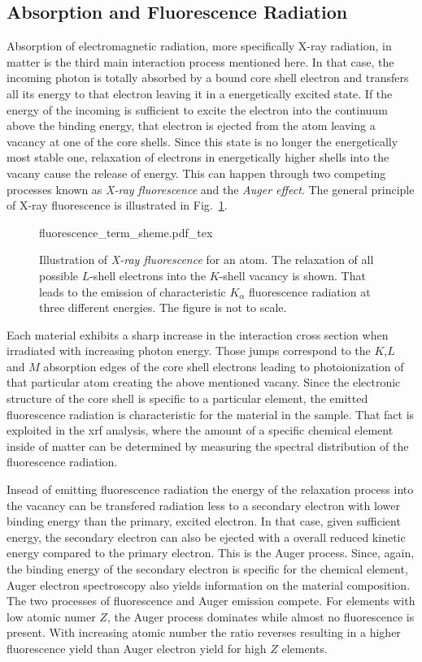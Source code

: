 \subsection{Absorption and Fluorescence Radiation}
Absorption of electromagnetic radiation, more specifically X-ray radiation, in matter is the third main interaction process mentioned here. In that case, the incoming photon is totally absorbed by a bound core shell electron and transfers all its energy to that electron leaving it in a energetically excited state. If the energy of the incoming is sufficient to excite the electron into the continuum above the binding energy, that electron is ejected from the atom leaving a vacancy at one of the core shells. Since this state is no longer the energetically most stable one, relaxation of electrons in energetically higher shells into the vacany cause the release of energy. This can happen through two competing processes known as \emph{X-ray fluorescence} and the \emph{Auger effect}. The general principle of X-ray fluorescence is illustrated in Fig.~\ref{ch_theo:fig_fluorescence_term_sheme}.
\begin{figure}[htb]
    \def\svgwidth{0.5\textwidth}
    {fluorescence_term_sheme.pdf_tex}
    \caption[Illustration of \emph{X-ray fluorescence} for an atom.]{Illustration of \emph{X-ray fluorescence} for an atom. The relaxation of all possible $L$-shell electrons into the $K$-shell vacancy is shown. That leads to the emission of characteristic $K_\alpha$ fluorescence radiation at three different energies. The figure is not to scale.}
    \label{ch_theo:fig_fluorescence_term_sheme}
\end{figure}

Each material exhibits a sharp increase in the interaction cross section when irradiated with increasing photon energy. Those jumps correspond to the $K$,$L$ and $M$ absorption edges of the core shell electrons leading to photoionization of that particular atom creating the above mentioned vacany. Since the electronic structure of the core shell is specific to a particular element, the emitted fluorescence radiation is characteristic for the material in the sample. That fact is exploited in the \gls{xrf} analysis, where the amount of a specific chemical element inside of matter can be determined by measuring the spectral distribution of the fluorescence radiation.

Insead of emitting fluorescence radiation the energy of the relaxation process into the vacancy can be transfered radiation less to a secondary electron with lower binding energy than the primary, excited electron. In that case, given sufficient energy, the secondary electron can also be ejected with a overall reduced kinetic energy compared to the primary electron. This is the Auger process. Since, again, the binding energy of the secondary electron is specific for the chemical element, Auger electron spectroscopy also yields information on the material composition. The two processes of fluorescence and Auger emission compete. For elements with low atomic numer $Z$, the Auger process dominates while almost no fluorescence is present. With increasing atomic number the ratio reverses resulting in a higher fluorescence yield than Auger electron yield for high $Z$ elements.

